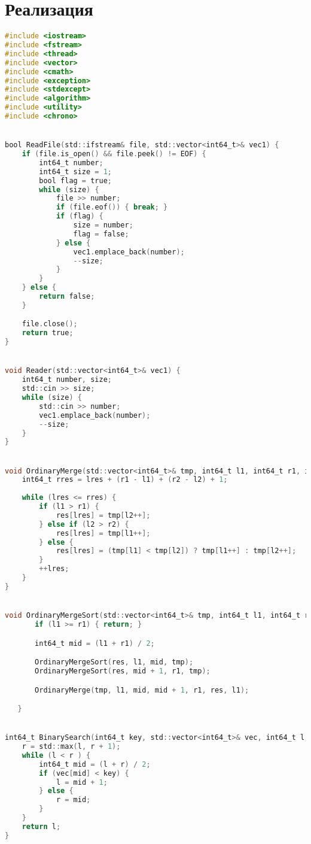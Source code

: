 \pagebreak

\section{Реализация}
\begin{lstlisting}[language=C]
#include <iostream>
#include <fstream>
#include <thread>
#include <vector>
#include <cmath>
#include <exception>
#include <stdexcept>
#include <algorithm>
#include <utility>
#include <chrono>


bool ReadFile(std::ifstream& file, std::vector<int64_t>& vec1) {
    if (file.is_open() && file.peek() != EOF) {
        int64_t number;
        int64_t size = 1;
        bool flag = true;
        while (size) {
            file >> number;
            if (file.eof()) { break; }
            if (flag) {
                size = number;
                flag = false;
            } else {
                vec1.emplace_back(number);
                --size;
            }
        }
    } else {
        return false;
    }

    file.close();
    return true;
}


void Reader(std::vector<int64_t>& vec1) {
    int64_t number, size;
    std::cin >> size;
    while (size) {
        std::cin >> number;
        vec1.emplace_back(number);
        --size;
    }
}


void OrdinaryMerge(std::vector<int64_t>& tmp, int64_t l1, int64_t r1, int64_t l2, int64_t r2, std::vector<int64_t>& res, int64_t lres) {
    int64_t rres = lres + (r1 - l1) + (r2 - l2) + 1;
    
    while (lres <= rres) {
        if (l1 > r1) {
            res[lres] = tmp[l2++];
        } else if (l2 > r2) {
            res[lres] = tmp[l1++];
        } else {
            res[lres] = (tmp[l1] < tmp[l2]) ? tmp[l1++] : tmp[l2++];
        }
        ++lres;
    }
}


void OrdinaryMergeSort(std::vector<int64_t>& tmp, int64_t l1, int64_t r1, std::vector<int64_t>& res) {
       if (l1 >= r1) { return; }

       int64_t mid = (l1 + r1) / 2;

       OrdinaryMergeSort(res, l1, mid, tmp);
       OrdinaryMergeSort(res, mid + 1, r1, tmp);

       OrdinaryMerge(tmp, l1, mid, mid + 1, r1, res, l1);

   }


int64_t BinarySearch(int64_t key, std::vector<int64_t>& vec, int64_t l, int64_t r) {
    r = std::max(l, r + 1);
    while (l < r ) {
        int64_t mid = (l + r) / 2;
        if (vec[mid] < key) {
            l = mid + 1;
        } else {
            r = mid;
        }
    }
    return l;
}



\end{lstlisting}
